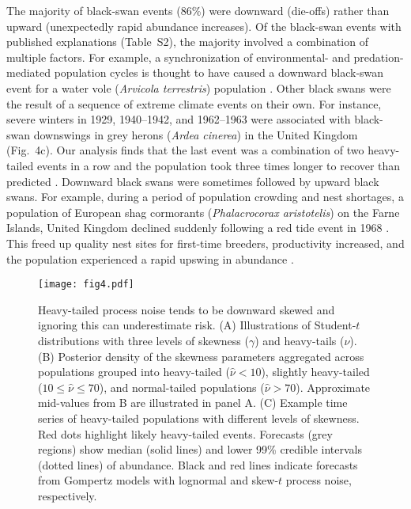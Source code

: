 \documentclass[9pt,twocolumn,twoside]{pnas-new}
\newcommand{\percBSDown}{86}
\begin{document}
The majority of black-swan events (\percBSDown \%) were downward (die-offs)
rather than upward (unexpectedly rapid abundance increases). Of the black-swan
events with published explanations (Table~S2), the majority involved
a combination of multiple factors. For example, a synchronization of
environmental- and predation-mediated population cycles is thought to have
caused a downward black-swan event for a water vole (\emph{Arvicola
terrestris}) population \cite{saucy1994}. Other black swans were the result of
a sequence of extreme climate events on their own. For instance, severe winters
in 1929, 1940--1942, and 1962--1963 were associated with black-swan downswings
in grey herons (\emph{Ardea cinerea}) in the United
Kingdom \cite{stafford1971} (Fig.~4c). Our analysis finds that the last event
was a combination of two heavy-tailed events in a row and the population took
three times longer to recover than predicted \cite{stafford1971}. Downward black
swans were sometimes followed by upward black swans. For example, during
a period of population crowding and nest shortages, a population of European
shag cormorants (\emph{Phalacrocorax aristotelis}) on the Farne Islands, United
Kingdom declined suddenly following a red tide event in 1968 \cite{potts1980}.
This freed up quality nest sites for first-time breeders, productivity
increased, and the population experienced a rapid upswing in
abundance \cite{potts1980}.

\begin{figure}[htb]
\centering
\texttt{[image: fig4.pdf]}
\caption{Heavy-tailed process noise tends to be downward skewed and
ignoring this can underestimate risk. (A) Illustrations of Student-$t$
distributions with three levels of skewness (\(\gamma\)) and heavy-tails (\(\nu\)).
(B) Posterior density of the skewness parameters aggregated across
populations grouped into heavy-tailed (\(\hat{\nu} < 10\)), slightly
heavy-tailed (\(10 \leq \hat{\nu} \leq 70\)), and normal-tailed populations
(\(\hat{\nu} > 70\)). Approximate mid-values from B are illustrated in
panel A. (C) Example time series of heavy-tailed populations with
different levels of skewness. Red dots highlight likely heavy-tailed events.
Forecasts (grey regions) show median (solid lines) and lower 99\% credible
intervals (dotted lines) of abundance. Black and red lines indicate forecasts
from Gompertz models with lognormal and skew-$t$ process noise, respectively.
}
\label{fig:4}
\end{figure}
\end{document}
